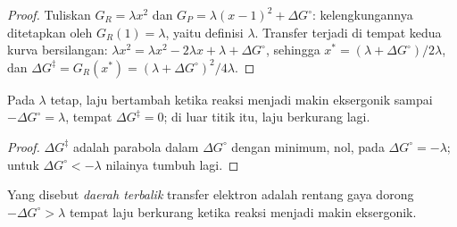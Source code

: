 \begin{proof}
Tuliskan $G_R = \lambda x^2$ dan $G_P = \lambda(x - 1)^2 + \Delta G^\circ$: kelengkungannya ditetapkan oleh $G_R(1) = \lambda$, yaitu
definisi $\lambda$. Transfer terjadi di tempat kedua kurva bersilangan: $\lambda x^2 = \lambda x^2 - 2\lambda x + \lambda +
\Delta G^\circ$, sehingga $x^\ast = (\lambda + \Delta G^\circ)/2\lambda$, dan $\Delta G^{\ddagger} = G_R(x^\ast) = (\lambda + \Delta G^\circ)^2/4\lambda$.
\end{proof}

\begin{corollary}\label{cor:b3:complex-mechanisms:inverted}
Pada $\lambda$ tetap, laju bertambah ketika reaksi menjadi makin eksergonik sampai
$-\Delta G^\circ = \lambda$, tempat $\Delta G^{\ddagger} = 0$; di luar titik itu, laju berkurang lagi.
\end{corollary}

\begin{proof}
$\Delta G^{\ddagger}$ adalah parabola dalam $\Delta G^\circ$ dengan minimum, nol, pada $\Delta G^\circ = -\lambda$; untuk $\Delta G^\circ < -\lambda$ nilainya tumbuh
lagi.
\end{proof}

\begin{definition}\label{def:b3:complex-mechanisms:inverted}
Yang disebut \emph{daerah terbalik} transfer elektron adalah
rentang gaya dorong $-\Delta G^\circ > \lambda$ tempat laju berkurang ketika reaksi menjadi
makin eksergonik.
\end{definition}

